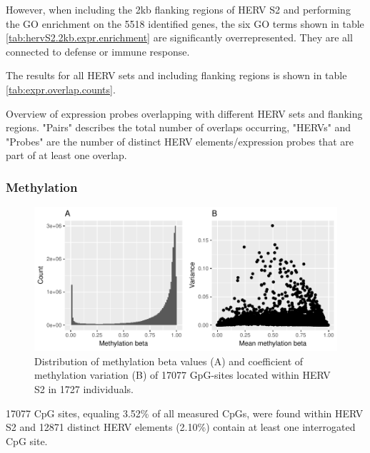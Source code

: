 \documentclass[a4paper,12pt,twoside,openright]{article}
\begin{document}
However, when including the 2kb flanking regions of HERV S2 and performing the GO enrichment on the 5518 identified genes, the six GO terms shown in table \ref{tab:hervS2.2kb.expr.enrichment} are significantly overrepresented. They are all connected to defense or immune response.

The results for all HERV sets and including flanking regions is shown in table \ref{tab:expr.overlap.counts}.

\begin{table}[h!]
  \begin{center}
  \end{center}        
	\caption{Overview of expression probes overlapping with different HERV sets and flanking regions. "Pairs" describes the total number of overlaps occurring, "HERVs" and "Probes" are the number of distinct HERV elements/expression probes that are part of at least one overlap.}
	\label{tab:expr.overlap.counts}
\end{table}

\subsubsection{Methylation}
\label{Results:Methylation}
\begin{figure}[tb]
	\includegraphics[scale = 1, keepaspectratio = true]{../figures/hervS2_meth_raw_hist_var}  
	\caption{Distribution of methylation beta values (A) and coefficient of methylation variation (B) of 17077 GpG-sites located within HERV S2 in 1727 individuals.}
    \label{fig:hervS2.meth.hist.var}
\end{figure}
17077 CpG sites, equaling 3.52\% of all measured CpGs, were found within HERV S2 and 12871 distinct HERV elements (2.10\%) contain at least one interrogated CpG site.
\end{document}
